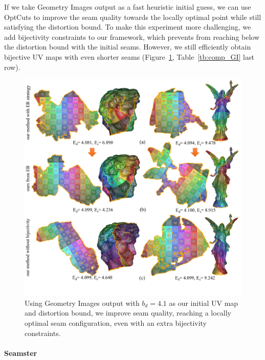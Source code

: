 If we take Geometry Images output as a fast heuristic initial guess, we can use OptCuts to improve the seam quality towards the locally optimal point while still satisfying the distortion bound. To make this experiment more challenging, we add bijectivity constraints to our framework, which prevents from reaching below the distortion bound with the initial seams. However, we still efficiently obtain bijective UV maps with even shorter seams (Figure~\ref{fig:comp_GI_outputAsInit}, Table~\ref{tb:comp_GI} last row).

\begin{figure}[!h]
\centering
\includegraphics[width=\linewidth]{fig/comp_GI_outputAsInit.png}
\caption{Using Geometry Images output with $b_d = 4.1$ as our initial UV map and distortion bound, we improve seam quality, reaching a locally optimal seam configuration, even with an extra bijectivity constraints.}
\label{fig:comp_GI_outputAsInit}
\end{figure}


\paragraph{Seamster}


